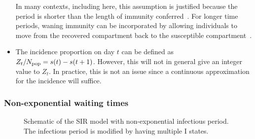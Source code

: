 \documentclass[thesis.tex]{subfiles}
\begin{document}
\begin{itemize}
    In many contexts, including here, this assumption is justified because the period is shorter than the length of immunity conferred~\autocite{milneImmunity}.
    For longer time periods, waning immunity can be incorporated by allowing individuals to move from the recovered compartment back to the susceptible compartment~\autocite[40]{keelingModeling}.
    \item The incidence proportion on day $t$ can be defined as $Z_t / N_\text{pop} = s(t) - s(t+1)$. However, this will not in general give an integer value to $Z_t$. In practice, this is not an issue since a continuous approximation for the incidence will suffice.
\end{itemize}


\subsubsection{Non-exponential waiting times} \label{SEIR:sec:non-exponential}
\begin{figure}[h]
  \caption[The SIR model with non-exponential infectious period]{Schematic of the SIR model with non-exponential infectious period. The infectious period is modified by having multiple I states.}
  \label{SEIR:fig:SIR-gamma}
\end{figure}
\end{document}

